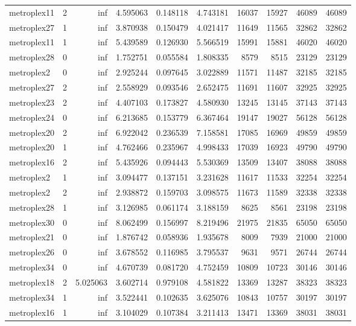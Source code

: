 \begin{longtable}{|l|r|r|r|r|r|r|r|r|r|}
metroplex11 & 2 & inf & 4.595063 & 0.148118 & 4.743181 & 16037 & 15927 & 46089 & 46089 \\
metroplex27 & 1 & inf & 3.870938 & 0.150479 & 4.021417 & 11649 & 11565 & 32862 & 32862 \\
metroplex11 & 1 & inf & 5.439589 & 0.126930 & 5.566519 & 15991 & 15881 & 46020 & 46020 \\
metroplex28 & 0 & inf & 1.752751 & 0.055584 & 1.808335 & 8579 & 8515 & 23129 & 23129 \\
metroplex2 & 0 & inf & 2.925244 & 0.097645 & 3.022889 & 11571 & 11487 & 32185 & 32185 \\
metroplex27 & 2 & inf & 2.558929 & 0.093546 & 2.652475 & 11691 & 11607 & 32925 & 32925 \\
metroplex23 & 2 & inf & 4.407103 & 0.173827 & 4.580930 & 13245 & 13145 & 37143 & 37143 \\
metroplex24 & 0 & inf & 6.213685 & 0.153779 & 6.367464 & 19147 & 19027 & 56128 & 56128 \\
metroplex20 & 2 & inf & 6.922042 & 0.236539 & 7.158581 & 17085 & 16969 & 49859 & 49859 \\
metroplex20 & 1 & inf & 4.762466 & 0.235967 & 4.998433 & 17039 & 16923 & 49790 & 49790 \\
metroplex16 & 2 & inf & 5.435926 & 0.094443 & 5.530369 & 13509 & 13407 & 38088 & 38088 \\
metroplex2 & 1 & inf & 3.094477 & 0.137151 & 3.231628 & 11617 & 11533 & 32254 & 32254 \\
metroplex2 & 2 & inf & 2.938872 & 0.159703 & 3.098575 & 11673 & 11589 & 32338 & 32338 \\
metroplex28 & 1 & inf & 3.126985 & 0.061174 & 3.188159 & 8625 & 8561 & 23198 & 23198 \\
metroplex30 & 0 & inf & 8.062499 & 0.156997 & 8.219496 & 21975 & 21835 & 65050 & 65050 \\
metroplex21 & 0 & inf & 1.876742 & 0.058936 & 1.935678 & 8009 & 7939 & 21000 & 21000 \\
metroplex26 & 0 & inf & 3.678552 & 0.116985 & 3.795537 & 9631 & 9571 & 26744 & 26744 \\
metroplex34 & 0 & inf & 4.670739 & 0.081720 & 4.752459 & 10809 & 10723 & 30146 & 30146 \\
metroplex18 & 2 & 5.025063 & 3.602714 & 0.979108 & 4.581822 & 13369 & 13287 & 38323 & 38323 \\
metroplex34 & 1 & inf & 3.522441 & 0.102635 & 3.625076 & 10843 & 10757 & 30197 & 30197 \\
metroplex16 & 1 & inf & 3.104029 & 0.107384 & 3.211413 & 13471 & 13369 & 38031 & 38031 \\

\end{longtable}
